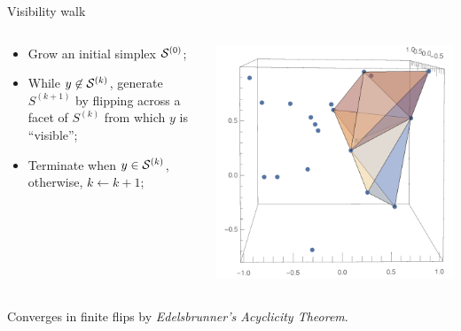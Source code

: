 \documentclass[xcolor=dvipsnames]{beamer}
\begin{document}
\begin{frame}{Visibility walk}
\begin{columns}
\begin{column}{.48\textwidth}
\begin{itemize}
\item Grow an initial simplex ${\cal S}^{(0)}$;
\item While $y \not\in {\cal S}^{(k)}$, generate $S^{(k+1)}$ by flipping
across a facet of $S^{(k)}$ from which $y$ is ``visible'';
\item Terminate when $y\in {\cal S}^{(k)}$, otherwise, $k \leftarrow k+1$;
\end{itemize}
\end{column}
\begin{column}{.48\textwidth}
\includegraphics[width=\textwidth]{DelaunayWalk.pdf}
\end{column}
\end{columns}
\medskip
Converges in finite flips by {\it Edelsbrunner's Acyclicity Theorem}.
\end{frame}
\end{document}
